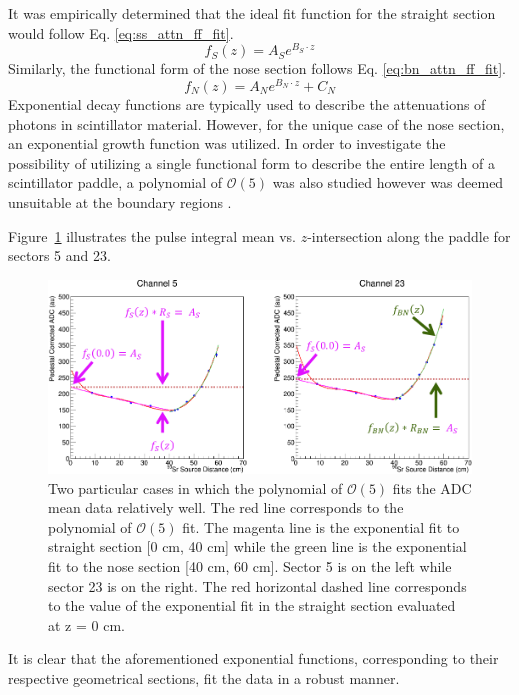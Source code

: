{It was empirically determined that the ideal fit function for the straight section would follow Eq. \ref{eq:ss_attn_ff_fit}.
	\begin{equation} \label{eq:ss_attn_ff_fit}
		f_{S}(z) = A_{S}e^{B_{S} \cdot z}
	\end{equation}
Similarly, the functional form of the nose section follows Eq. \ref{eq:bn_attn_ff_fit}.
	\begin{equation} \label{eq:bn_attn_ff_fit}
		f_{N}(z) = A_{N}e^{B_{N} \cdot z} + C_{N}
	\end{equation}
Exponential decay functions are typically used to describe the attenuations of photons in scintillator material.  However, for the unique case of the nose section, an exponential growth function was utilized.  In order to investigate the possibility of utilizing a single functional form to describe the entire length of a scintillator paddle, a polynomial of $\mathcal{O}(5)$ was also studied however was deemed unsuitable at the boundary regions \cite{pooser16}.

Figure~\ref{fig:attfits} illustrates the pulse integral mean vs. $z$-intersection along the paddle for sectors 5 and 23.  
\begin{figure}[!htb]
	\centering
	\includegraphics[width=1.0\columnwidth]{calibration/figs/attn_fits}
	\caption{Two particular cases in which the polynomial of $\mathcal{O}(5)$ fits the ADC mean data relatively well.  The red line corresponds to the polynomial of $\mathcal{O}(5)$ fit.  The magenta line is the exponential fit to straight section [0 cm, 40 cm] while the green line is the exponential fit to the nose section [40 cm, 60 cm].  Sector 5 is on the left while sector 23 is on the right.  The red horizontal dashed line corresponds to the value of the exponential fit in the straight section evaluated at z = 0 cm.}
	\label{fig:attfits}
\end{figure}
It is clear that the aforementioned exponential functions, corresponding to their respective geometrical sections, fit the data in a robust manner. 

}
